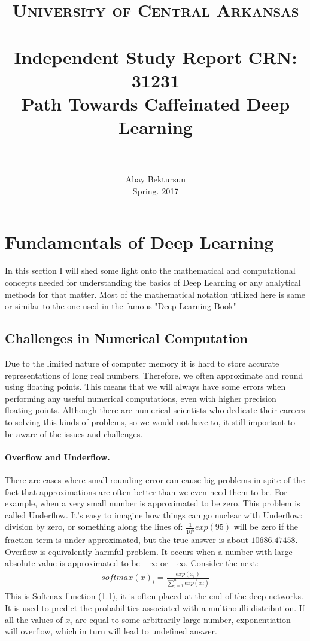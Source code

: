 \documentclass[paper=a4, fontsize=11pt]{scrartcl}
\title{
	\usefont{OT1}{bch}{b}{n}
	\normalfont \normalsize \textsc{University of Central Arkansas} \\ [25pt]
	\horrule{0.5pt} \\[0.4cm]
	\large Independent Study Report CRN: 31231 \\
	\huge Path Towards Caffeinated Deep Learning \\
	\horrule{2pt} \\[0.5cm]
}
\author{
	\normalfont 			\normalsize
	Abay Bektursun\\[-3pt]	\normalsize
	Spring. 2017\\[-3pt]	\normalsize
}
\date{}
\numberwithin{equation}{section}		%
\numberwithin{figure}{section}			%
\numberwithin{table}{section}			%
\begin{document}
	
	\maketitle
	\section{Fundamentals of Deep Learning}
		In this section I will shed some light onto the mathematical and computational concepts needed for understanding the basics of Deep Learning or any analytical methods for that matter. Most of the mathematical notation utilized here is same or similar to the one used in the famous "Deep Learning Book" \cite{Goodfellow-et-al-2016}
	
	\subsection{Challenges in Numerical Computation}
		Due to the limited nature of computer memory it is hard to store accurate representations of long real numbers. Therefore, we often approximate and round using floating points. This means that we will always have some errors when performing any useful numerical computations, even with higher precision floating points. Although there are numerical scientists who dedicate their careers to solving this kinds of problems, so we would not have to, it still important to be aware of the issues and challenges. 
	\paragraph{Overflow and Underflow.}
	There are cases where small rounding error can cause big problems in spite of the fact that approximations are often better than we even need them to be. For example, when a very small number is approximated to be zero. This problem is called Underflow. It's easy to imagine how things can go nuclear with Underflow: division by zero, or something along the lines of: $ \frac{1}{10^5}exp(95) $ will be zero if the fraction term is under approximated, but the true answer is about $ 10686.47458 $. Overflow is equivalently harmful problem. It occurs when a number with large absolute value is approximated to be $-\infty $ or $+\infty $. Consider the next: 
	\begin{align}
	softmax(x)_{i} = \frac{exp(x_{i})}{\sum_{j=1}^{n}exp(x_{j})}
	\end{align}
	This is Softmax function (1.1), it is often placed at the end of the deep networks. It is used to predict the probabilities associated with a multinoulli distribution. If all the values of $ x_{i} $ are equal to some arbitrarily large number, exponentiation will overflow, which in turn will lead to undefined answer. 
\end{document}
